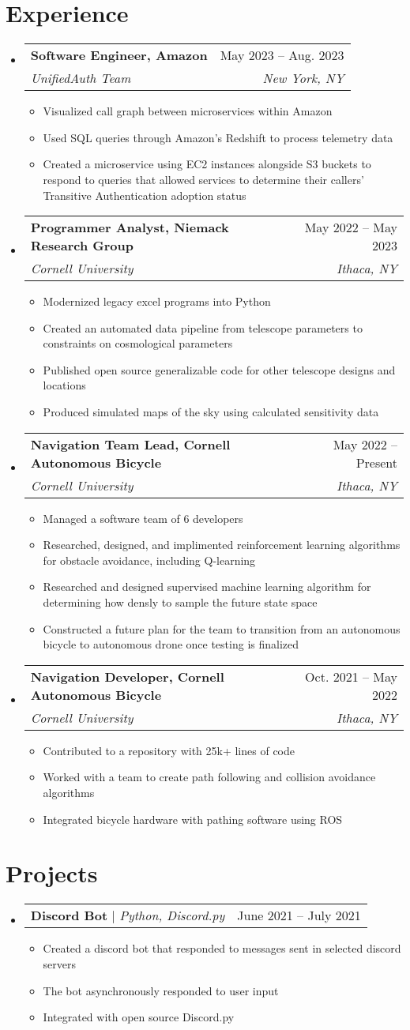 \documentclass[letterpaper,11pt]{article}
\makeatletter
\newcommand{\resumeItem}[1]{
  \item\small{
    {#1 \vspace{-2pt}}
  }
}
\newcommand{\resumeSubheading}[4]{
  \vspace{-2pt}\item
    \begin{tabular*}{0.97\textwidth}[t]{l@{\extracolsep{\fill}}r}
      \textbf{#1} & #2 \\
      \textit{\small#3} & \textit{\small #4} \\
    \end{tabular*}\vspace{-7pt}
}
\newcommand{\resumeProjectHeading}[2]{
    \item
    \begin{tabular*}{0.97\textwidth}{l@{\extracolsep{\fill}}r}
      \small#1 & #2 \\
    \end{tabular*}\vspace{-7pt}
}
\newcommand{\resumeSubHeadingListStart}{\begin{itemize}[leftmargin=0.15in, label={}]}
\newcommand{\resumeSubHeadingListEnd}{\end{itemize}}
\newcommand{\resumeItemListStart}{\begin{itemize}}
\newcommand{\resumeItemListEnd}{\end{itemize}\vspace{-5pt}}
\makeatother
\begin{document}
\section{Experience}
\resumeSubHeadingListStart

\resumeSubheading{Software Engineer, Amazon}{May 2023 -- Aug. 2023}
{UnifiedAuth Team}{New York, NY}
\resumeItemListStart
\resumeItem{Visualized call graph between microservices within Amazon}
\resumeItem{Used SQL queries through Amazon's Redshift to process telemetry data}
\resumeItem{Created a microservice using EC2 instances alongside S3 buckets to respond to queries that allowed services to determine their callers' Transitive Authentication adoption status}
\resumeItemListEnd

\resumeSubheading
{Programmer Analyst, Niemack Research Group}{May 2022 -- May 2023}
{Cornell University}{Ithaca, NY}
\resumeItemListStart
\resumeItem{Modernized legacy excel programs into Python}
\resumeItem{Created an automated data pipeline from telescope parameters to constraints on cosmological parameters}
\resumeItem{Published open source generalizable code for other telescope designs and locations}
\resumeItem{Produced simulated maps of the sky using calculated sensitivity data}
\resumeItemListEnd

\resumeSubheading
{Navigation Team Lead, Cornell Autonomous Bicycle}{May 2022 -- Present}
{Cornell University}{Ithaca, NY}
\resumeItemListStart
\resumeItem{Managed a software team of 6 developers}
\resumeItem{Researched, designed, and implimented reinforcement learning algorithms for obstacle avoidance, including Q-learning}
\resumeItem{Researched and designed supervised machine learning algorithm for determining how densly to sample the future state space}
\resumeItem{Constructed a future plan for the team to transition from an autonomous bicycle to autonomous drone once testing is finalized}
\resumeItemListEnd

\resumeSubheading
{Navigation Developer, Cornell Autonomous Bicycle}{Oct. 2021 -- May 2022}
{Cornell University}{Ithaca, NY}
\resumeItemListStart
\resumeItem{Contributed to a repository with 25k+ lines of code}
\resumeItem{Worked with a team to create path following and collision avoidance algorithms}
\resumeItem{Integrated bicycle hardware with pathing software using ROS}
\resumeItemListEnd

\resumeSubHeadingListEnd


\section{Projects}
\resumeSubHeadingListStart
\resumeProjectHeading
{\textbf{Discord Bot} $|$ \emph{Python, Discord.py}}{June 2021 -- July 2021}
\resumeItemListStart
\resumeItem{Created a discord bot that responded to messages sent in selected discord servers}
\resumeItem{The bot asynchronously responded to user input}
\resumeItem{Integrated with open source Discord.py}
\resumeItemListEnd
\resumeSubHeadingListEnd
\end{document}

